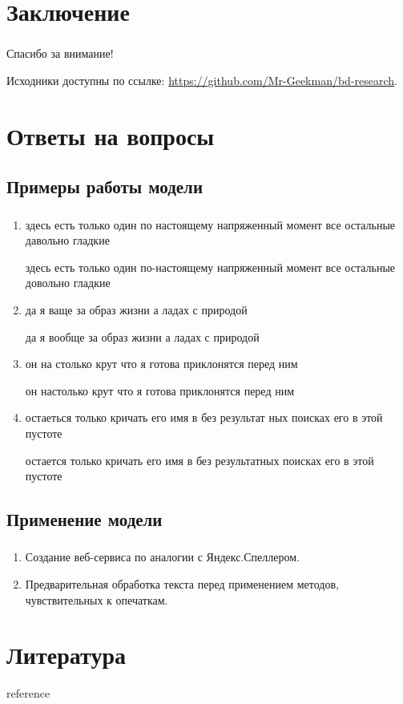\documentclass[t, aspectratio=169]{beamer}  %
\begin{document}
\section{Заключение}
\begin{frame}
	\frametitle{\insertsection} 
	\vspace{5em}
	\begin{center}
		\huge Спасибо за внимание!
	\end{center}
	\vspace{5em}
	Исходники доступны по ссылке: \url{https://github.com/Mr-Geekman/bd-research}.
\end{frame}

\section{Ответы на вопросы}
\subsection{Примеры работы модели}
\begin{frame}
	\frametitle{\insertsection} 
	\framesubtitle{\insertsubsection}
	\begin{enumerate}
		\item 
		здесь есть только один {\color{red} по настоящему} напряженный момент все остальные {\color{red} давольно} гладкие
		
		здесь есть только один {\color{green} по-настоящему} напряженный момент все остальные {\color{green} довольно} гладкие
		\item 
		да я {\color{red} ваще} за образ жизни а ладах с природой
		
		да я {\color{green} вообще} за образ жизни а ладах с природой
		\item 
		он {\color{red} на столько} крут что я готова {\color{red} приклонятся} перед ним
		
		он {\color{green} настолько} крут что я готова {\color{red} приклонятся} перед ним
		\item 
		{\color{red} остаеться} только кричать его имя в {\color{red} без результат ных} поисках его в этой пустоте
		
		{\color{green} остается} только кричать его имя в {\color{red} без результатных} поисках его в этой пустоте

	\end{enumerate}
\end{frame}

\subsection{Применение модели}
\begin{frame}
	\frametitle{\insertsection} 
	\framesubtitle{\insertsubsection}
	\begin{enumerate}
		\item Создание веб-сервиса по аналогии с Яндекс.Спеллером.
		\item Предварительная обработка текста перед применением методов, чувствительных к опечаткам.
	\end{enumerate}
\end{frame}

\section{Литература}
\begin{frame}[allowframebreaks]{reference}
	\frametitle{\insertsection} 
	\printbibliography
\end{frame}
\end{document}
